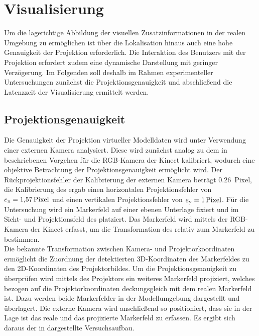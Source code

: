 \prever{
}



\section{Visualisierung}
Um die lagerichtige Abbildung der visuellen Zusatzinformationen in der realen Umgebung zu ermöglichen ist über die Lokalisation hinaus auch eine hohe Genauigkeit der Projektion erforderlich. Die Interaktion des Benutzers mit der Projektion erfordert zudem eine dynamische Darstellung mit geringer Verzögerung. Im Folgenden soll deshalb im Rahmen experimenteller Untersuchungen zunächst die Projektionsgenauigkeit und abschließend die Latenzzeit der Visualisierung ermittelt werden.

\subsection{Projektionsgenauigkeit}
Die Genauigkeit der Projektion virtueller Modelldaten wird unter Verwendung einer externen Kamera analysiert. Diese wird zunächst analog zu dem in  beschriebenen Vorgehen für die RGB-Kamera der Kinect kalibriert, wodurch eine objektive Betrachtung der Projektionsgenauigkeit ermöglicht wird. Der Rückprojektionsfehler der Kalibrierung der externen Kamera beträgt \SI{0,26}{Pixel}, die Kalibrierung des  ergab einen horizontalen Projektionsfehler von $e_{\mathrm{x}} = \SI{1,57}{Pixel}$ und einen vertikalen Projektionsfehler von $e_{\mathrm{y}} = \SI{1}{Pixel}$. Für die Untersuchung wird ein Markerfeld auf einer ebenen Unterlage fixiert und im Sicht- und Projektionsfeld des  platziert. Das Markerfeld wird mittels der RGB-Kamera der Kinect erfasst, um die Transformation des  relativ zum Markerfeld zu bestimmen.\\

Die bekannte Transformation zwischen Kamera- und Projektorkoordinaten ermöglicht die Zuordnung der detektierten 3D-Koordinaten des Markerfeldes zu den 2D-Koordinaten des Projektorbildes. Um die Projektionsgenauigkeit zu überprüfen wird mittels des Projektors ein weiteres Markerfeld projiziert, welches bezogen auf die Projektorkoordinaten deckungsgleich mit dem realen Markerfeld ist. Dazu werden beide Markerfelder in der Modellumgebung dargestellt und überlagert. Die externe Kamera wird anschließend so positioniert, dass sie in der Lage ist das reale und das projizierte Markerfeld zu erfassen. Es ergibt sich daraus der in  dargestellte Versuchsaufbau.

